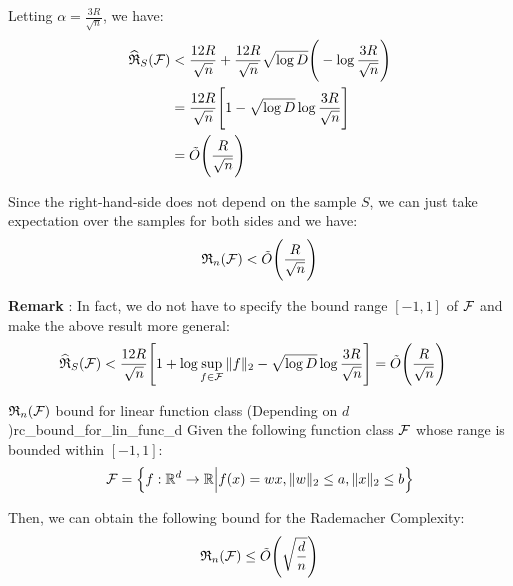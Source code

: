 \begin{proof*}
    \noindent Letting $\alpha=\frac{3R}{\sqrt n}$, we have:
    \begin{align*}
        \widehat{\mathfrak{R}}_S(\mathcal{F}) &< \frac{12R}{\sqrt n} + \frac{12R}{\sqrt n}\sqrt{\log D} \Bigg(  - \log\frac{3R}{\sqrt n}  \Bigg) \\
        &= \frac{12R}{\sqrt n} \Bigg[ 
            1 - \sqrt{\log D}\log\frac{3R}{\sqrt{n}}
         \Bigg] \\
        &= \tilde O\Bigg(  \frac{R}{\sqrt n}  \Bigg)
    \end{align*}

    \noindent Since the right-hand-side does not depend on the sample $S$, we can just take expectation over the samples for both sides and we have:
    \begin{align*}
        \mathfrak{R}_n(\mathcal{F}) < \tilde O\Bigg(  \frac{R}{\sqrt n}  \Bigg)
    \end{align*}

    \noindent \textbf{Remark} : In fact, we do not have to specify the bound range $[-1, 1]$ of $\mathcal{F}$ and make the above result more general:
    \begin{align*}
        \widehat{\mathfrak{R}}_S(\mathcal{F}) &< \frac{12R}{\sqrt n}\Bigg[ 
            1 + \log\sup_{f\in\mathcal{F}}\|f\|_2 - \sqrt{\log D}\log\frac{3R}{\sqrt{n}}
         \Bigg] = \tilde O\Bigg(  \frac{R}{\sqrt n}  \Bigg)
    \end{align*}
\end{proof*}


\begin{proposition}{$\mathfrak{R}_n(\mathcal{F})$ bound for linear function class (Depending on $d$)}{rc_bound_for_lin_func_d}
    Given the following function class $\mathcal{F}$ whose range is bounded within $[-1, 1]$:
    \begin{align*}
        \mathcal{F} = \Big\{ 
            f:\mathbb{R}^d\to\mathbb{R} \Big| f(x) = wx, \|w\|_2 \le a, \|x\|_2 \le b
         \Big\}
    \end{align*}

    \noindent Then, we can obtain the following bound for the Rademacher Complexity:
    \begin{align*}
        \mathfrak{R}_n(\mathcal{F}) \le \tilde O \Bigg( \sqrt{
            \frac{d}{n}
        } \Bigg)
    \end{align*}
\end{proposition}

